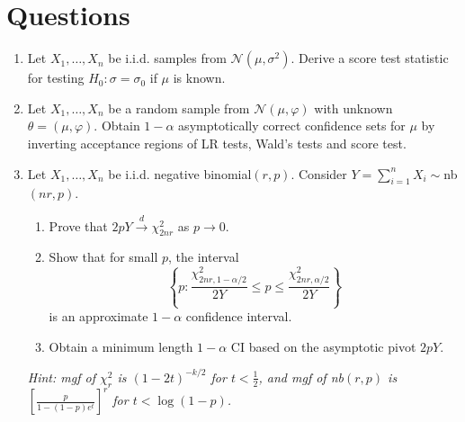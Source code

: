 \documentclass[12pt]{extarticle}
\newcommand{\N}{\mathcal N}
\begin{document}
\section{Questions}
 
\begin{enumerate}
	\item Let $X_1,\ldots,X_n$ be i.i.d. samples from $\mathcal N(\mu,\sigma^2)$. Derive a score test statistic for testing $H_0: \sigma = \sigma_0$ if $\mu$ is known. 
	\newpage
	\item Let $X_1,\ldots,X_n$ be a random sample from $\N(\mu, \varphi)$ with unknown $\theta = (\mu,\varphi)$. Obtain $1-\alpha$ asymptotically correct confidence sets for $\mu$ by inverting acceptance regions of LR tests, Wald's tests and score test.
	\vskip 9cm
	\item Let $X_1,\ldots, X_n$ be i.i.d. negative binomial$(r,p)$. Consider $Y = \sum_{i=1}^nX_i\sim$nb$(nr,p)$.
	\begin{enumerate}
		\item Prove that $2pY\xrightarrow{d}\chi_{2nr}^2$ as $p\rightarrow 0$.
		\item Show that for small $p$, the interval 
		$$\left\{p: \dfrac{\chi_{2nr, 1-\alpha/2}^2}{2Y}\leq p\leq \dfrac{\chi_{2nr, \alpha/2}^2}{2Y}\right\}$$ is an approximate $1-\alpha$ confidence interval.
		\item Obtain a minimum length $1-\alpha$ CI based on the asymptotic pivot $2pY$.
	\end{enumerate}
	\textit{Hint: mgf of $\chi^2_{r}$ is $(1 - 2t)^{-k/2}$ for $t < \frac{1}{2}$, and mgf of nb$(r,p)$ is $[\frac{p}{1-(1-p)e^t}]^r$ for $t<\log(1-p)$.}
\end{enumerate}
\end{document}
